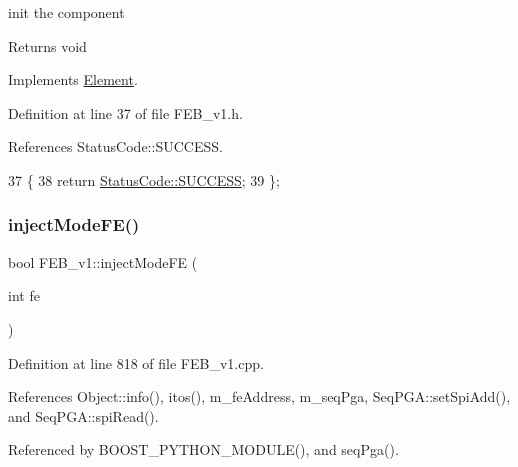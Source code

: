 init the component

\begin{DoxyReturn}{Returns}
void 
\end{DoxyReturn}


Implements \hyperlink{classElement_af42754b5cabc198869222725218d695c}{Element}.



Definition at line 37 of file F\+E\+B\+\_\+v1.\+h.



References Status\+Code\+::\+S\+U\+C\+C\+E\+SS.


\begin{DoxyCode}
37                     \{
38     \textcolor{keywordflow}{return} \hyperlink{classStatusCode_a6f565cbeadc76d14c72f047e5e85eb4badd0da38d3ba0d922efd1f4619bc37ad8}{StatusCode::SUCCESS};
39   \};
\end{DoxyCode}
\mbox{\label{classFEB__v1_adad5a9a1dc8f650a59e6edb310451cab}} 
\subsubsection{\texorpdfstring{inject\+Mode\+F\+E()}{injectModeFE()}}
{\footnotesize\ttfamily bool F\+E\+B\+\_\+v1\+::inject\+Mode\+FE (\begin{DoxyParamCaption}\item[{int}]{fe }\end{DoxyParamCaption})}



Definition at line 818 of file F\+E\+B\+\_\+v1.\+cpp.



References Object\+::info(), itos(), m\+\_\+fe\+Address, m\+\_\+seq\+Pga, Seq\+P\+G\+A\+::set\+Spi\+Add(), and Seq\+P\+G\+A\+::spi\+Read().



Referenced by B\+O\+O\+S\+T\+\_\+\+P\+Y\+T\+H\+O\+N\+\_\+\+M\+O\+D\+U\+L\+E(), and seq\+Pga().


